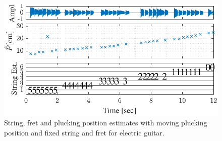 \documentclass{article}
\begin{document}
\begin{sloppy}
\begin{figure}[t]
\centering
   \includegraphics[width=.86\linewidth]{img/tablature_constant_note25_LSD}\vspace{-2mm}
   \caption{String, fret and plucking position estimates with moving plucking position and fixed string and fret for electric guitar.}
   \label{fig:pluck_position_fixed_tabs} 
\end{figure}
%

\end{sloppy}
\end{document}
